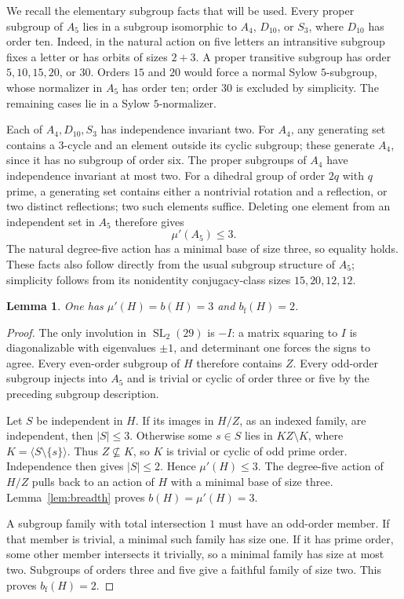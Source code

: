 \IfFileExists{baustms.cls}{\bulletinformattrue\documentclass[plain]{baustms}}{\bulletinformatfalse\documentclass[11pt]{amsart}}
\theoremstyle{cupthm}
\newtheorem{lemma}[theorem]{Lemma}
\newcommand{\mup}{\mu'}
\newcommand{\bfth}{b_{\mathrm f}}
\newcommand{\SL}{\operatorname{SL}}
\begin{document}
We recall the elementary subgroup facts that will be used. Every proper
subgroup of $A_5$ lies in a subgroup isomorphic to $A_4$, $D_{10}$, or
$S_3$, where $D_{10}$ has order ten. Indeed, in the natural action on five
letters an intransitive subgroup fixes a letter or has orbits of sizes
$2+3$. A proper transitive subgroup has order $5,10,15,20$, or $30$.
Orders $15$ and $20$ would force a normal Sylow $5$-subgroup, whose
normalizer in $A_5$ has order ten; order $30$ is excluded by simplicity.
The remaining cases lie in a Sylow $5$-normalizer.

Each of $A_4,D_{10},S_3$ has independence invariant two. For $A_4$, any
generating set contains a $3$-cycle and an element outside its cyclic
subgroup; these generate $A_4$, since it has no subgroup of order six.
The proper subgroups of $A_4$ have independence invariant at most two.
For a dihedral group of order $2q$ with $q$ prime, a generating set
contains either a nontrivial rotation and a reflection, or two distinct
reflections; two such elements suffice. Deleting one element from an
independent set in $A_5$ therefore gives
\begin{equation}\label{eq:A5}
 \mup(A_5)\le3.
\end{equation}
The natural degree-five action has a minimal base of size three, so equality
holds. These facts also follow directly from the usual subgroup structure of
$A_5$; simplicity follows from its nonidentity conjugacy-class sizes
$15,20,12,12$.

\begin{lemma}\label{lem:H}
One has $\mup(H)=b(H)=3$ and $\bfth(H)=2$.
\end{lemma}
\begin{proof}
The only involution in $\SL_2(29)$ is $-I$: a matrix squaring to $I$
is diagonalizable with eigenvalues $\pm1$, and determinant one forces
the signs to agree. Every even-order subgroup of $H$ therefore contains
$Z$. Every odd-order subgroup injects into $A_5$ and is trivial or cyclic
of order three or five by the preceding subgroup description.

Let $S$ be independent in $H$. If its images in $H/Z$, as an indexed
family, are independent, then $|S|\le3$. Otherwise some $s\in S$ lies
in $KZ\setminus K$, where $K=\langle S\setminus\{s\}\rangle$.
Thus $Z\nsubseteq K$, so $K$ is trivial or cyclic of odd prime order.
Independence then gives $|S|\le2$. Hence $\mup(H)\le3$.
The degree-five action of $H/Z$ pulls back to an action of $H$ with a
minimal base of size three. Lemma~\ref{lem:breadth} proves
$b(H)=\mup(H)=3$.

A subgroup family with total intersection $1$ must have an odd-order
member. If that member is trivial, a minimal such family has size one.
If it has prime order, some other member intersects it trivially, so
a minimal family has size at most two. Subgroups of orders three and five
give a faithful family of size two. This proves $\bfth(H)=2$.
\end{proof}
\end{document}
